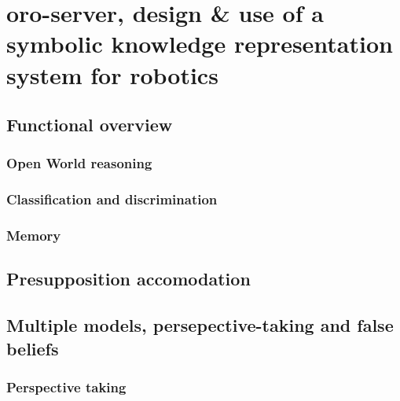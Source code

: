 \chapter{oro-server, design \& use of a symbolic knowledge representation system for robotics}
\label{chapter|oroserver}


\section{Functional overview}
\label{sect|functional-overview}


\subsection{ Open World reasoning}
\label{sect|open-world-reasoning}

\subsection{Classification and discrimination}
\label{subssect|discrimination}

\subsection{Memory}
\label{subssect|memory}

\section{Presupposition accomodation}
\label{sect|presupposition-accomodation}



\section{Multiple models, persepective-taking and false beliefs}
\label{subssect|alterite}

\subsection{Perspective taking}
\label{subssect|perspective-taking}

